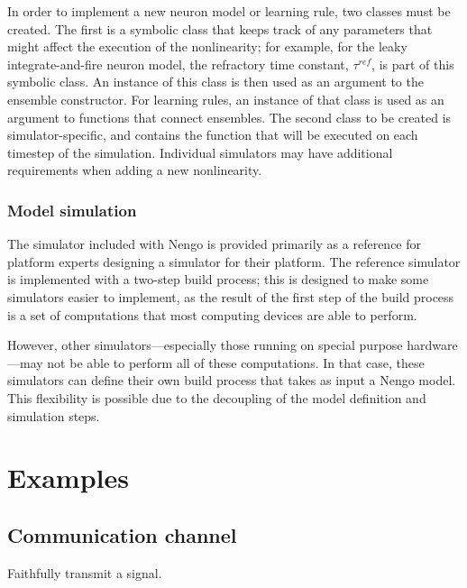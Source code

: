 \documentclass{frontiersSCNS}
\begin{document}
In order to implement
a new neuron model or learning rule,
two classes must be created.
The first is a symbolic class
that keeps track of any parameters
that might affect the execution
of the nonlinearity;
for example, for
the leaky integrate-and-fire neuron model,
the refractory time constant,
$\tau^{ref}$, is part of this symbolic class.
An instance of this class
is then used as an argument
to the ensemble constructor.
For learning rules,
an instance of that class
is used as an argument
to functions that connect ensembles.
The second class to be created
is simulator-specific,
and contains the function that will be
executed on each timestep of the simulation.
Individual simulators may have additional
requirements when adding
a new nonlinearity.

\subsubsection{Model simulation}

The simulator included with Nengo
is provided primarily as a reference
for platform experts designing a simulator
for their platform.
The reference simulator is implemented with
a two-step build process;
this is designed to make
some simulators easier to implement,
as the result of
the first step of the build process
is a set of computations
that most computing devices are able to perform.

However, other simulators---especially
those running on special purpose
hardware---may not be able
to perform all of these computations.
In that case, these simulators
can define their own build process
that takes as input a Nengo model.
This flexibility is possible
due to the decoupling of
the model definition and simulation steps.

\section{Examples} \label{sec:examples}

\subsection{Communication channel} \label{sec:comm-channel}

Faithfully transmit a signal.
\end{document}
